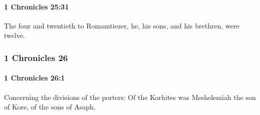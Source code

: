 		\paragraph{1 Chronicles 25:31} %
			\label{1CHRONICLES-25-31}

			The four and twentieth to Romamtiezer, he, his sons, and his brethren, were twelve.

	\subsubsection{1 Chronicles 26} %
		\label{1CHRONICLES-26}

		\paragraph{1 Chronicles 26:1} %
			\label{1CHRONICLES-26-1}

			Concerning the divisions of the porters: Of the Korhites was Meshelemiah the son of Kore, of the sons of Asaph.

